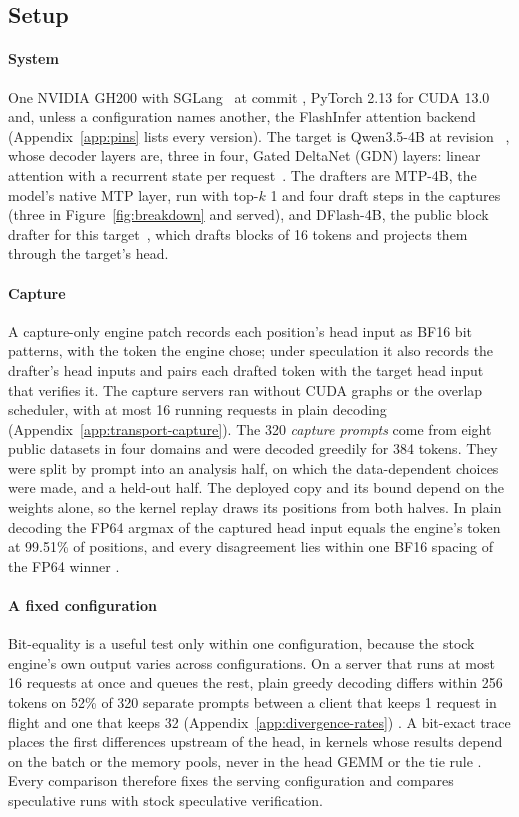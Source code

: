 \subsection{Setup}\label{sec:setup}\label{sec:transport-capture}
\paragraph{System} One NVIDIA GH200 with SGLang~\cite{sglangpaper} at commit \sourcepin{}, PyTorch 2.13 for CUDA 13.0 and, unless a configuration names another, the FlashInfer attention backend (Appendix~\ref{app:pins} lists every version). The target is Qwen3.5-4B at revision \modelpin~\cite{qwencard}, whose decoder layers are, three in four, Gated DeltaNet (GDN) layers: linear attention with a recurrent state per request~\cite{gdn}. The drafters are MTP-4B, the model's native MTP layer, run with top-$k$ 1 and four draft steps in the captures (three in Figure~\ref{fig:breakdown} and served), and DFlash-4B, the public block drafter for this target~\cite{dflashpaper,dflash4bcard}, which drafts blocks of 16 tokens and projects them through the target's head.

\paragraph{Capture} A capture-only engine patch records each position's head input as BF16 bit patterns, with the token the engine chose; under speculation it also records the drafter's head inputs and pairs each drafted token with the target head input that verifies it. The capture servers ran without CUDA graphs or the overlap scheduler, with at most 16 running requests in plain decoding (Appendix~\ref{app:transport-capture}). The 320 \emph{capture prompts} come from eight public datasets in four domains and were decoded greedily for 384 tokens. They were split by prompt into an analysis half, on which the data-dependent choices were made, and a held-out half. The deployed copy and its bound depend on the weights alone, so the kernel replay draws its positions from both halves. In plain decoding the FP64 argmax of the captured head input equals the engine's token at 99.51\% of positions, and every disagreement lies within one BF16 spacing of the FP64 winner .
\paragraph{A fixed configuration}\label{sec:same-shape} Bit-equality is a useful test only within one configuration, because the stock engine's own output varies across configurations. On a server that runs at most 16 requests at once and queues the rest, plain greedy decoding differs within 256 tokens on 52\% of 320 separate prompts between a client that keeps 1 request in flight and one that keeps 32 (Appendix~\ref{app:divergence-rates}) . A bit-exact trace places the first differences upstream of the head, in kernels whose results depend on the batch or the memory pools, never in the head GEMM or the tie rule . Every comparison therefore fixes the serving configuration and compares speculative runs with stock speculative verification.

